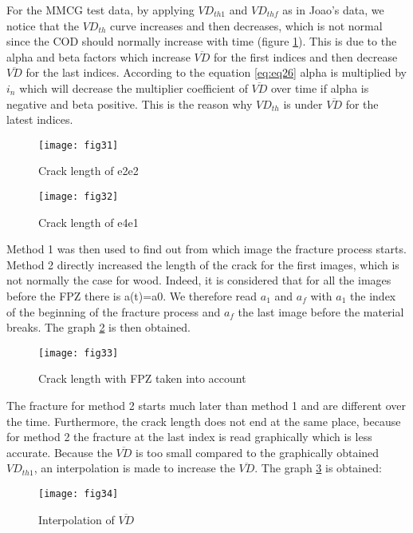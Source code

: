 For the MMCG test data, by applying $VD_{th1}$ and $VD_{thf}$ as in Joao's data, we notice that the $VD_{th}$ curve increases and then decreases, which is not normal since the COD should normally increase with time (figure \ref{fig:fig32}). This is due to the alpha and beta factors which increase $\overline{VD}$ for the first indices and then decrease $\overline{VD}$ for the last indices. According to the equation \ref{eq:eq26} alpha is multiplied by $i_n$ which will decrease the multiplier coefficient of $\overline{VD}$ over time if alpha is negative and beta positive. This is the reason why $VD_{th}$ is under $\overline{VD}$  for the latest indices.

\begin{figure}[htp]
	\begin{minipage}[c]{.46\linewidth}
		\centering
		\texttt{[image: fig31]}
		\caption{Crack length of e2e2}
		\label{fig:fig31}
	\end{minipage}
	\hfill%
	\begin{minipage}[c]{.46\linewidth}
		\centering
		\texttt{[image: fig32]}
		\caption{Crack length of e4e1}
		\label{fig:fig32}
	\end{minipage}
\end{figure}


Method 1 was then used to find out from which image the fracture process starts. Method 2 directly increased the length of the crack for the first images, which is not normally the case for wood.  Indeed, it is considered that for all the images before the FPZ there is a(t)=a0. We therefore read $a_1$ and $a_f$ with $a_1$ the index of the beginning of the fracture process and $a_f$ the last image before the material breaks. The graph \ref{fig:fig33} is then obtained.


\begin{figure}[htp]
	\centering
	\texttt{[image: fig33]}
	\caption{Crack length with FPZ taken into account}
	\label{fig:fig33}
\end{figure}

The fracture for method 2 starts much later than method 1 and are different over the time. Furthermore, the crack length does not end at the same place, because for method 2 the fracture at the last index is read graphically which is less accurate.
Because the $\overline{VD}$ is too small compared to the graphically obtained $VD_{th1}$, an interpolation is made to increase the $\overline{VD}$. The graph \ref{fig:fig34} is obtained:

\begin{figure}[htp]
	\centering
	\texttt{[image: fig34]}
	\caption{Interpolation of $\overline{VD}$}
	\label{fig:fig34}
\end{figure}

